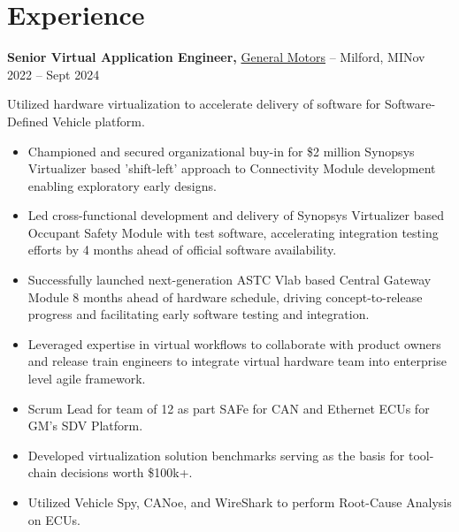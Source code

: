 \documentclass[11pt]{article}       %
\begin{document}
\section*{Experience}
\textbf{Senior Virtual Application Engineer,} \href{}{General Motors} -- Milford, MI\hfill Nov 2022 -- Sept 2024\\
\vspace{-9pt}
\begin{flushleft}
  Utilized hardware virtualization to accelerate delivery of software for Software-Defined Vehicle platform.
\end{flushleft}
\vspace{-21pt}
\begin{itemize}
  \item Championed and secured organizational buy-in for \$2 million Synopsys Virtualizer based 'shift-left' approach to Connectivity Module development enabling exploratory early designs.
  \item Led cross-functional development and delivery of Synopsys Virtualizer based Occupant Safety Module with test software, accelerating integration testing efforts by 4 months ahead of official software availability.
  \item Successfully launched next-generation ASTC Vlab based Central Gateway Module 8 months ahead of hardware schedule, driving concept-to-release progress and facilitating early software testing and integration.
  \item Leveraged expertise in virtual workflows to collaborate with product owners and release train engineers to integrate virtual hardware team into enterprise level agile framework.
  \item Scrum Lead for team of 12 as part SAFe for CAN and Ethernet ECUs for GM’s SDV Platform.
  \item Developed virtualization solution benchmarks serving as the basis for tool-chain decisions worth \$100k+.
  \item Utilized Vehicle Spy, CANoe, and WireShark to perform Root-Cause Analysis on ECUs.
\end{itemize}
\end{document}
